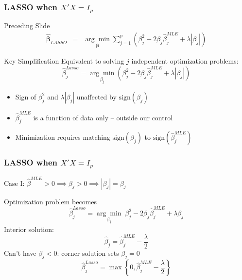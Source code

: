 \begin{frame}
  \frametitle{LASSO when $X'X = I_p$}
  \begin{block}{Preceding Slide}
    \vspace{-1.5em}
\begin{eqnarray*}
  \widehat{\boldsymbol{\beta}}_{LASSO} 
  &=& \underset{\boldsymbol{\beta}}{\arg \min}  \sum_{j=1}^p \left(\beta_j^2 - 2 \beta_j \widehat{\beta}^{MLE}_j + \lambda\left|\beta_j \right|\right)
\end{eqnarray*}
  \end{block}

  \vspace{-1em}

  \begin{alertblock}{Key Simplification}
  Equivalent to solving $j$ independent optimization problems:
  \vspace{-0.5em}
  \[
	\widehat{\beta}^{Lasso}_j = \underset{\beta_j}{\arg \min} \left(\beta_j^2 - 2 \beta_j \widehat{\beta}^{MLE}_j + \lambda\left|\beta_j \right|\right)
  \]
  \vspace{-2em}
  \begin{itemize}
    \item Sign of $\beta_j^2$ and $\lambda |\beta_j|$ unaffected by $\mbox{sign}(\beta_j)$
    \item $\widehat{\beta}_j^{MLE}$ is a function of data only -- outside our control
    \item Minimization requires \alert{matching} $\mbox{sign}(\beta_j)$ to $\mbox{sign}(\widehat{\beta}^{MLE}_j)$
  \end{itemize}
  \end{alertblock}
\end{frame}
\begin{frame}
  \frametitle{LASSO when $X'X = I_p$}

  \begin{block}{Case I: $\widehat{\beta}^{MLE}>0 \implies \beta_j > 0 \implies |\beta_j| = \beta_j$}
    
Optimization problem becomes
\[\widehat{\beta}^{Lasso}_j = \underset{\beta_j}{\arg \min} \; \beta_j^2 - 2 \beta_j \widehat{\beta}^{MLE}_j + \lambda\beta_j\]
Interior solution:
\[\widehat{\beta}_j = \widehat{\beta}^{MLE}_j - \frac{\lambda}{2}\]
  Can't have $\beta_j<0$: corner solution sets $\beta_j = 0$
\[\widehat{\beta}^{Lasso}_j = \max\left\{0,\widehat{\beta}^{MLE}_j - \frac{\lambda}{2}\right\}\] 
  \end{block}
  
\end{frame}
